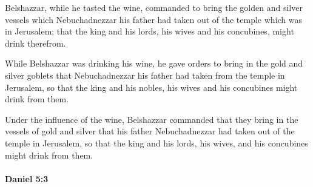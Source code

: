 			\begin{versebox}
					\item[BHS] 
					\item[LXX] 
					\item[ASV] Belshazzar, while he tasted the wine, commanded to bring the golden and silver vessels which Nebuchadnezzar his father had taken out of the temple which was in Jerusalem; that the king and his lords, his wives and his concubines, might drink therefrom.
					\item[NIV] While Belshazzar was drinking his wine, he gave orders to bring in the gold and silver goblets that Nebuchadnezzar his father had taken from the temple in Jerusalem, so that the king and his nobles, his wives and his concubines might drink from them.
					\item[NRSV] Under the influence of the wine, Belshazzar commanded that they bring in the vessels of gold and silver that his father Nebuchadnezzar had taken out of the temple in Jerusalem, so that the king and his lords, his wives, and his concubines might drink from them.
			\end{versebox}

		\paragraph{Daniel 5:3} %
			\label{DANIEL-5-3}

